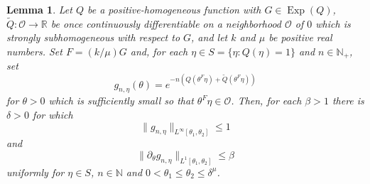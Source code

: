 \documentclass[11pt]{article}
\newtheorem{lemma}[theorem]{Lemma}
\newcommand\Exp{\operatorname{Exp}}
\begin{document}
\begin{lemma}\label{lem:AmplitudeSobolevEstimates}
Let $Q$ be a positive-homogeneous function with $G\in\Exp(Q)$, $\widetilde{Q}:\mathcal{O}\to\mathbb{R}$ be once continuously differentiable on a neighborhood $\mathcal{O}$ of $0$ which is strongly subhomogeneous with respect to $G$, and let $k$ and $\mu$ be positive real numbers. Set $F=(k/\mu) G$ and, for each $\eta\in S=\{\eta:Q(\eta)=1\}$ and $n\in\mathbb{N}_+$, set
\begin{equation*}
    g_{n,\eta}(\theta)=e^{-n\left(Q\left(\theta^F\eta\right)+\widetilde{Q}\left(\theta^F\eta\right)\right)}
\end{equation*}
for $\theta>0$ which is sufficiently small so that $\theta^F\eta\in\mathcal{O}$. Then, for each $\beta>1$ there is $\delta>0$ for which 
\begin{equation*}
    \|g_{n,\eta}\|_{L^\infty[\theta_1,\theta_2]}\leq 1
\end{equation*}
and
\begin{equation*}
    \|\partial_\theta g_{n,\eta}\|_{L^1[\theta_1,\theta_2]}\leq \beta
\end{equation*}
uniformly for $\eta\in S$, $n\in\mathbb{N}$ and $0<\theta_1\leq\theta_2\leq \delta^{\mu}$.
\end{lemma}
\end{document}

